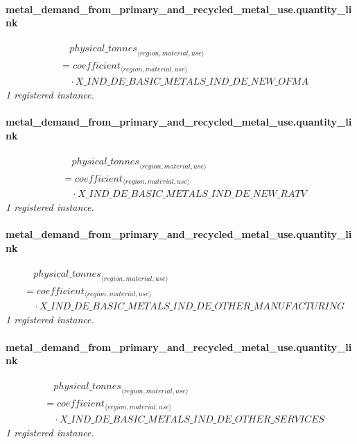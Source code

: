 \documentclass[11pt]{article}
\begin{document}
\paragraph{metal\_demand\_from\_primary\_and\_recycled\_metal\_use.quantity\_link}
\begin{align*}
&\quad {physical\_tonnes}_{\langle region, material, use\rangle}\\
&= coefficient_{\langle region, material, use\rangle}\\
&\quad {}\cdot X\_IND\_DE\_BASIC\_METALS\_IND\_DE\_NEW\_OFMA
\end{align*}
\noindent\emph{1 registered instance.}\par
\paragraph{metal\_demand\_from\_primary\_and\_recycled\_metal\_use.quantity\_link}
\begin{align*}
&\quad {physical\_tonnes}_{\langle region, material, use\rangle}\\
&= coefficient_{\langle region, material, use\rangle}\\
&\quad {}\cdot X\_IND\_DE\_BASIC\_METALS\_IND\_DE\_NEW\_RATV
\end{align*}
\noindent\emph{1 registered instance.}\par
\paragraph{metal\_demand\_from\_primary\_and\_recycled\_metal\_use.quantity\_link}
\begin{align*}
&\quad {physical\_tonnes}_{\langle region, material, use\rangle}\\
&= coefficient_{\langle region, material, use\rangle}\\
&\quad {}\cdot X\_IND\_DE\_BASIC\_METALS\_IND\_DE\_OTHER\_MANUFACTURING
\end{align*}
\noindent\emph{1 registered instance.}\par
\paragraph{metal\_demand\_from\_primary\_and\_recycled\_metal\_use.quantity\_link}
\begin{align*}
&\quad {physical\_tonnes}_{\langle region, material, use\rangle}\\
&= coefficient_{\langle region, material, use\rangle}\\
&\quad {}\cdot X\_IND\_DE\_BASIC\_METALS\_IND\_DE\_OTHER\_SERVICES
\end{align*}
\noindent\emph{1 registered instance.}\par
\end{document}
